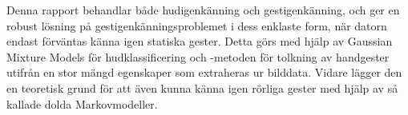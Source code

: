 \documentclass[../rapport_MVEX01-11-05]{subfiles}
\begin{document}
Denna rapport behandlar både hudigenkänning och gestigenkänning, och ger en
robust lösning på gestigenkänningsproblemet i dess enklaste form, när
datorn endast förväntas känna igen statiska gester. Detta görs med hjälp av
Gaussian Mixture Models för hudklassificering och \knn-metoden för tolkning
av handgester utifrån en stor mängd egenskaper som extraheras ur bilddata.
Vidare lägger den en
teoretisk grund för att även kunna känna igen rörliga gester med hjälp av
så kallade dolda Markovmodeller.
\end{document}
